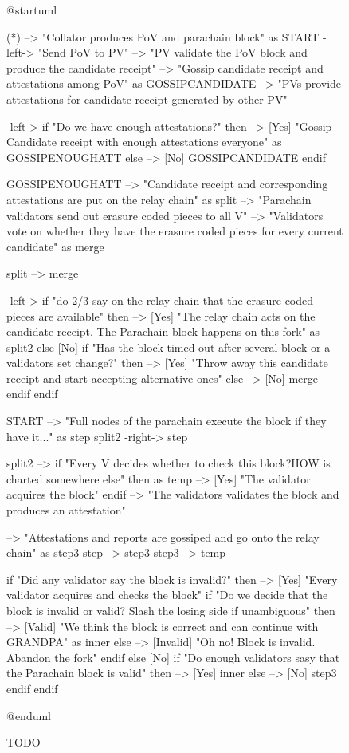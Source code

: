 \documentclass{book}
\begin{document}
\begin{figure}[h!]
\begin{plantuml}
@startuml

(*) --> "Collator produces PoV and parachain block" as START
-left-> "Send PoV to PV"
--> "PV validate the PoV block and produce the candidate receipt"
--> "Gossip candidate receipt and attestations among PoV" as GOSSIPCANDIDATE
--> "PVs provide attestations for candidate receipt generated by other PV"

-left-> if "Do we have enough attestations?" then
    --> [Yes] "Gossip Candidate receipt with enough attestations everyone" as GOSSIPENOUGHATT
else
    --> [No] GOSSIPCANDIDATE
endif

GOSSIPENOUGHATT --> "Candidate receipt and corresponding attestations are put on the relay chain" as split
--> "Parachain validators send out erasure coded pieces to all V"
--> "Validators vote on whether they have the erasure coded pieces for every current candidate" as merge

split --> merge

-left-> if "do 2/3 say on the relay chain that the erasure coded pieces are available" then
    --> [Yes] "The relay chain acts on the candidate receipt. The Parachain block happens on this fork" as split2
else
    [No] if "Has the block timed out after several block or a validators set change?" then
        --> [Yes] "Throw away this candidate receipt and start accepting alternative ones"
    else
        --> [No] merge
    endif
endif

START --> "Full nodes of the parachain execute the block if they have it..." as step
split2 -right-> step

split2 --> if "Every V decides whether to check this block?HOW is charted somewhere else" then as temp
    --> [Yes] "The validator acquires the block"
endif
--> "The validators validates the block and produces an attestation"

--> "Attestations and reports are gossiped and go onto the relay chain" as step3
step --> step3
step3 --> temp

if "Did any validator say the block is invalid?" then
    --> [Yes] "Every validator acquires and checks the block"
    if "Do we decide that the block is invalid or valid? Slash the losing side if unambiguous" then
        --> [Valid] "We think the block is correct and can continue with GRANDPA" as inner
    else
        --> [Invalid] "Oh no! Block is invalid. Abandon the fork"
    endif
else
    [No] if "Do enough validators sasy that the Parachain block is valid" then
        --> [Yes] inner
    else
        --> [No] step3
    endif
endif

@enduml
\end{plantuml}
\caption{TODO}
\end{figure}
\end{document}
